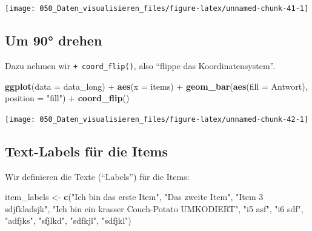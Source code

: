 \documentclass[12pt,]{book}
\newenvironment{Shaded}{\begin{snugshade}}{\end{snugshade}}
\newcommand{\KeywordTok}[1]{\textcolor[rgb]{0.13,0.29,0.53}{\textbf{{#1}}}}
\newcommand{\DataTypeTok}[1]{\textcolor[rgb]{0.13,0.29,0.53}{{#1}}}
\newcommand{\StringTok}[1]{\textcolor[rgb]{0.31,0.60,0.02}{{#1}}}
\newcommand{\NormalTok}[1]{{#1}}
\begin{document}
\begin{center}\texttt{[image: 050\_Daten\_visualisieren\_files/figure-latex/unnamed-chunk-41-1]} \end{center}

\subsection{Um 90° drehen}\label{um-90-drehen}

Dazu nehmen wir \texttt{+\ coord\_flip()}, also ``flippe das
Koordinatensystem''.

\begin{Shaded}
\begin{Highlighting}[]
\KeywordTok{ggplot}\NormalTok{(}\DataTypeTok{data =} \NormalTok{data_long) +}
\StringTok{  }\KeywordTok{aes}\NormalTok{(}\DataTypeTok{x =} \NormalTok{items)  +}
\StringTok{  }\KeywordTok{geom_bar}\NormalTok{(}\KeywordTok{aes}\NormalTok{(}\DataTypeTok{fill =} \NormalTok{Antwort), }\DataTypeTok{position =} \StringTok{"fill"}\NormalTok{) +}
\StringTok{  }\KeywordTok{coord_flip}\NormalTok{()}
\end{Highlighting}
\end{Shaded}

\begin{center}\texttt{[image: 050\_Daten\_visualisieren\_files/figure-latex/unnamed-chunk-42-1]} \end{center}

\subsection{Text-Labels für die Items}\label{text-labels-fur-die-items}

Wir definieren die Texte (``Labels'') für die Items:

\begin{Shaded}
\begin{Highlighting}[]
\NormalTok{item_labels <-}\StringTok{ }\KeywordTok{c}\NormalTok{(}\StringTok{"Ich bin das erste Item"}\NormalTok{,}
                 \StringTok{"Das zweite Item"}\NormalTok{,}
                 \StringTok{"Item 3 sdjfkladsjk"}\NormalTok{,}
                 \StringTok{"Ich bin ein krasser Couch-Potato UMKODIERT"}\NormalTok{,}
\StringTok{"i5 asf"}\NormalTok{, }\StringTok{"i6 sdf"}\NormalTok{, }\StringTok{"adfjks"}\NormalTok{, }\StringTok{"sfjlkd"}\NormalTok{, }\StringTok{"sdfkjl"}\NormalTok{, }\StringTok{"sdfjkl"}\NormalTok{)}
\end{Highlighting}
\end{Shaded}
\end{document}
